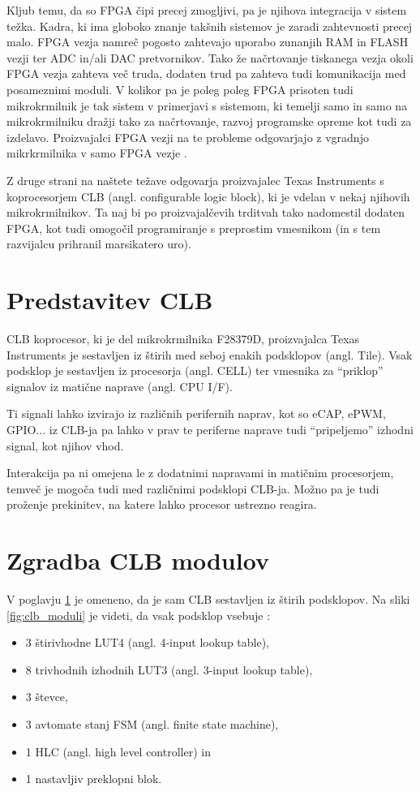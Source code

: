 \documentclass[a4paper]{article}
\begin{document}
\begin{sloppypar}
Kljub temu, da so FPGA čipi precej zmogljivi, pa je njihova integracija v
sistem težka.  Kadra, ki ima globoko znanje takšnih sistemov je zaradi
zahtevnosti precej malo. FPGA vezja namreč pogosto zahtevajo uporabo zunanjih
RAM in FLASH vezji ter ADC in/ali DAC pretvornikov. Tako že načrtovanje
tiskanega vezja okoli FPGA vezja zahteva več truda, dodaten trud pa zahteva
tudi komunikacija med posameznimi moduli. V kolikor pa je poleg poleg FPGA
prisoten tudi mikrokrmilnik je tak sistem v primerjavi s sistemom, ki temelji
samo in samo na mikrokrmilniku dražji tako za načrtovanje, razvoj programske
opreme kot tudi za izdelavo. Proizvajalci FPGA vezji na te probleme odgovarjajo
z vgradnjo mikrkrmilnika v samo FPGA vezje \cite{fpga-developers-guide}.

Z druge strani na naštete težave odgovarja proizvajalec Texas Instruments s
koprocesorjem CLB (angl. configurable logic block), ki je vdelan v nekaj
njihovih mikrokrmilnikov. Ta naj bi po proizvajalčevih trditvah tako nadomestil
dodaten FPGA, kot tudi omogočil
programiranje s preprostim vmesnikom (in s tem razvijalcu prihranil marsikatero uro)\cite{clb-intro}.


\section{Predstavitev CLB}\label{sec:predstavitev}
CLB koprocesor, ki je del mikrokrmilnika F28379D, proizvajalca Texas
Instruments je sestavljen iz štirih med seboj enakih podsklopov (angl. Tile).
Vsak podsklop je sestavljen iz procesorja (angl. CELL) ter vmesnika za
``priklop'' signalov iz matične naprave (angl. CPU I/F).

Ti signali lahko izvirajo iz različnih perifernih naprav, kot so eCAP, ePWM,
GPIO... iz CLB-ja pa lahko v prav te periferne naprave tudi ``pripeljemo''
izhodni signal, kot njihov vhod.

Interakcija pa ni omejena le z dodatnimi napravami in matičnim procesorjem,
temveč je mogoča tudi med različnimi podsklopi CLB-ja. Možno pa je tudi
proženje prekinitev, na katere lahko procesor ustrezno reagira.

\section{Zgradba CLB modulov}\label{sec:zgradbaclb}
V poglavju \ref{sec:predstavitev} je omeneno, da je sam CLB sestavljen iz
štirih podsklopov. Na sliki \ref{fig:clb_moduli} je videti, da vsak podsklop
vsebuje \cite[Pogl.~26.4]{mcu-ref-manual}:
\begin{itemize}
    \item 3 štirivhodne LUT4 (angl. 4-input lookup table),
    \item 8 trivhodnih izhodnih LUT3 (angl. 3-input lookup table),
    \item 3 števce,
    \item 3 avtomate stanj FSM (angl. finite state machine),
    \item 1 HLC (angl. high level controller) in
    \item 1 nastavljiv preklopni blok.
\end{itemize}


\end{sloppypar}
\end{document}
